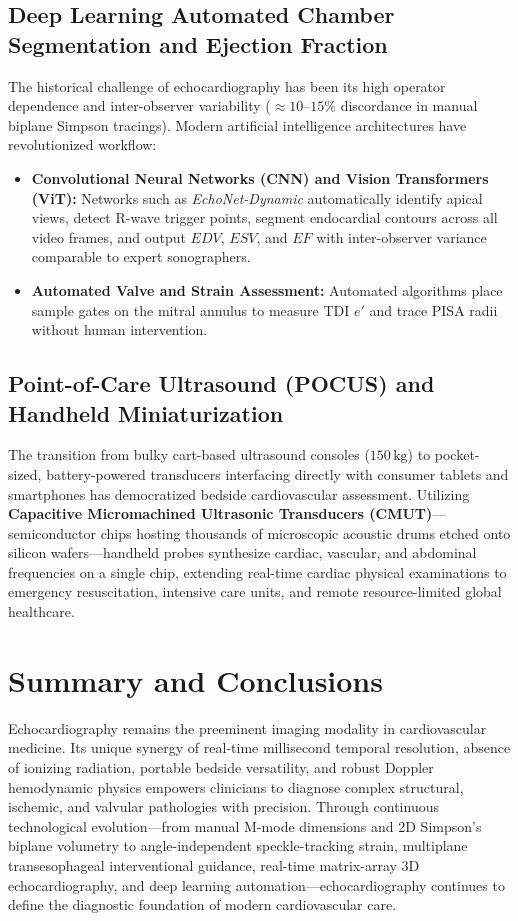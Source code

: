 \documentclass[11pt,a4paper]{article}
\begin{document}
\subsection{Deep Learning Automated Chamber Segmentation and Ejection Fraction}

The historical challenge of echocardiography has been its high operator dependence and inter-observer variability ($\approx 10\text{--}15\%$ discordance in manual biplane Simpson tracings). Modern artificial intelligence architectures have revolutionized workflow:
\begin{itemize}[leftmargin=*]
    \item \textbf{Convolutional Neural Networks (CNN) and Vision Transformers (ViT):} Networks such as \textit{EchoNet-Dynamic} automatically identify apical views, detect R-wave trigger points, segment endocardial contours across all video frames, and output $EDV$, $ESV$, and $EF$ with inter-observer variance comparable to expert sonographers.
    \item \textbf{Automated Valve and Strain Assessment:} Automated algorithms place sample gates on the mitral annulus to measure TDI $e'$ and trace PISA radii without human intervention.
\end{itemize}

\subsection{Point-of-Care Ultrasound (POCUS) and Handheld Miniaturization}

The transition from bulky cart-based ultrasound consoles ($150\,\text{kg}$) to pocket-sized, battery-powered transducers interfacing directly with consumer tablets and smartphones has democratized bedside cardiovascular assessment. Utilizing \textbf{Capacitive Micromachined Ultrasonic Transducers (CMUT)}---semiconductor chips hosting thousands of microscopic acoustic drums etched onto silicon wafers---handheld probes synthesize cardiac, vascular, and abdominal frequencies on a single chip, extending real-time cardiac physical examinations to emergency resuscitation, intensive care units, and remote resource-limited global healthcare.

\section{Summary and Conclusions}

Echocardiography remains the preeminent imaging modality in cardiovascular medicine. Its unique synergy of real-time millisecond temporal resolution, absence of ionizing radiation, portable bedside versatility, and robust Doppler hemodynamic physics empowers clinicians to diagnose complex structural, ischemic, and valvular pathologies with precision. Through continuous technological evolution—from manual M-mode dimensions and 2D Simpson's biplane volumetry to angle-independent speckle-tracking strain, multiplane transesophageal interventional guidance, real-time matrix-array 3D echocardiography, and deep learning automation—echocardiography continues to define the diagnostic foundation of modern cardiovascular care.
\end{document}
